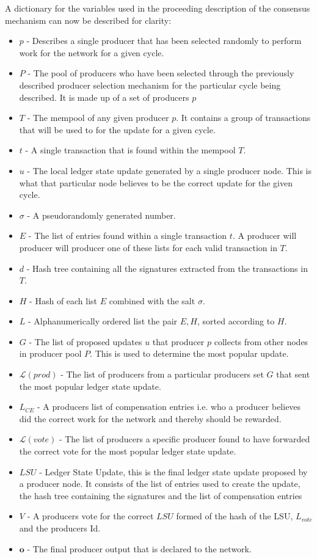 A dictionary for the variables used in the proceeding description of the consensus mechanism can now be described for clarity:

\begin{itemize}

\item $p$ - Describes a single producer that has been selected randomly to perform work for the network for a given cycle. 
\item $P$ - The pool of producers who have been selected through the previously described producer selection mechanism for the particular cycle being described. It is made up of a set of producers $p$
\item $T$ - The mempool of any given producer $p$. It contains a group of transactions that will be used to for the update for a given cycle. 
\item $t$ - A single transaction that is found within the mempool $T$. 
\item $u$ - The local ledger state update generated by a single producer node. This is what that particular node believes to be the correct update for the given cycle. 
\item $\sigma$ - A pseudorandomly generated number. 
\item $E$ - The list of entries found within a single transaction $t$. A producer will producer  will producer one of these lists for each valid transaction in $T$.
\item $d$ - Hash tree containing all the signatures extracted from the transactions in $T$.
\item $H$ - Hash of each list $E$ combined with the salt $\sigma$.
\item $L$ - Alphanumerically ordered list the pair $E,H$, sorted according to $H$. 
\item $G$ - The list of proposed updates $u$ that producer $p$ collects from other nodes in producer pool $P$. This is used to determine the most popular update. 
\item $\mathcal{L}(prod)$ - The list of producers from a particular producers set $G$ that sent the most popular ledger state update.
\item $L_{CE}$ - A producers list of compensation entries i.e. who a producer believes did the correct work for the network and thereby should be rewarded. 
\item $\mathcal{L}(vote)$ - The list of producers a specific producer found to have forwarded the correct vote for the most popular ledger state update. 
\item $LSU$ - Ledger State Update, this is the final ledger state update proposed by a producer node. It consists of the list of entries used to create the update, the hash tree containing the signatures and the list of compensation entries
\item $V$ - A producers vote for the correct $LSU$ formed of the hash of the LSU, $L_{vote}$ and the producers Id.
\item $\mathbf{o}$ - The final producer output that is declared to the network. 
\end{itemize}
